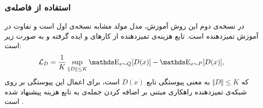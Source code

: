 \subsubsection{استفاده از فاصله‌ی }
در نسخه‌ی دوم این روش آموزش، مدل مولد مشابه نسخه‌ی اول است و تفاوت در آموزش تمیزدهنده است. تابع هزینه‌ی تمیزدهنده از کار‌های
\cite{Arjovsky17Wasserstein}
و
\cite{Gulrajaniy17ImprovedWasserstein}
ایده گرفته و به صورت زیر است:
\begin{equation}
\mathcal{L}_D = \frac{1}{K} \sup_{ \Vert D \Vert \leq K} \ME_{x \sim Q}[D(x)] - \ME_{x \sim P} [D(x)] ,
\end{equation}
که 
$ \Vert D \Vert \leq K$
به معنی  پیوستگی
تابع 
$D(x)$
است، برای اعمال این پیوستگی  بر روی شبکه‌ی تمیزدهنده راهکاری مبتنی بر اضافه کردن جمله‌ی 
به تابع هزینه پیشنهاد شده است
\cite{Gulrajaniy17ImprovedWasserstein}.
